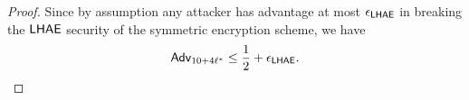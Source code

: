 \begin{proof}
 Since by assumption any attacker has advantage at most $\epsilon_{\mathsf{LHAE}}$ in breaking the $\mathsf{LHAE}$ security of the symmetric encryption scheme, we have
 \begin{equation}
  \mathsf{Adv}_{10 + 4\ell^{\ast}} \leq \frac{1}{2} + \epsilon_{\mathsf{LHAE}}.
 \end{equation}%
\end{proof}